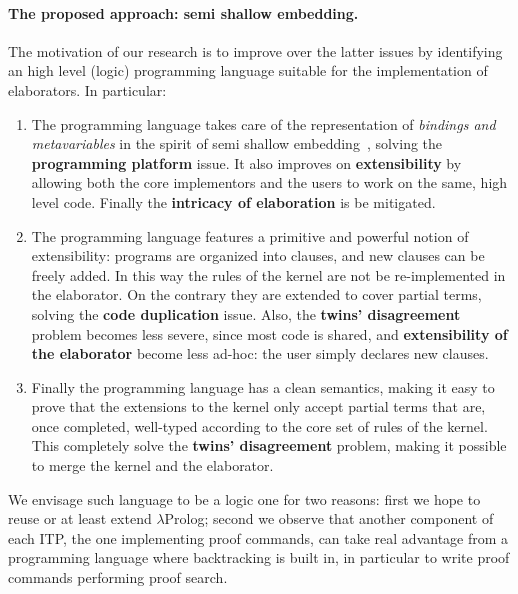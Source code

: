 \documentclass{easychair}
\begin{document}
\paragraph{The proposed approach: semi shallow embedding.}

The motivation of our research is to improve over the latter issues by
identifying an high level (logic) programming language suitable for
the implementation of elaborators. In particular:
\begin{enumerate}
\item The programming language takes care of the representation of
	\emph{bindings and metavariables} in the spirit of semi
	shallow embedding~\cite{holsuperlight},
	solving the \textbf{programming platform} issue.
	It also improves on \textbf{extensibility} by allowing
	both the core implementors and the users to work on the same,
	high level code.
	Finally the \textbf{intricacy of elaboration} is be mitigated.
\item The programming language features a primitive and powerful
	notion of extensibility: programs are organized into clauses,
	and new clauses can be freely added.
	In this way the rules of the kernel are not be re-implemented in the
	elaborator. On the contrary they are extended to cover partial terms,
	solving the \textbf{code duplication} issue.
	Also, the \textbf{twins' disagreement} problem becomes less severe,
	since most code is shared, and
	\textbf{extensibility of the elaborator}
	become less ad-hoc: the user simply declares new clauses.
\item Finally the programming language has a clean semantics, making it
	easy to prove that the extensions to the kernel
	only accept partial terms that are, once completed,
	well-typed according
	to the core set of rules of the kernel.  This completely
	solve the \textbf{twins' disagreement} problem, making it possible to
	merge the kernel and the elaborator.
\end{enumerate}

We envisage such language to be a logic one for two reasons:
first we hope to reuse or at least extend $\lambda$Prolog;
second we observe that another component of each ITP, the one
implementing proof commands, can take real advantage from a 
programming language where backtracking is built in, in
particular to write proof commands performing proof search.
\end{document}
